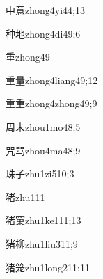 \begin{verbete}{中意}{zhong4yi4}{4;13}
\end{verbete}

\begin{verbete}{种地}{zhong4di4}{9;6}
\end{verbete}

\begin{verbete}{重}{zhong4}{9}
\end{verbete}

\begin{verbete}{重量}{zhong4liang4}{9;12}
\end{verbete}

\begin{verbete}{重重}{zhong4zhong4}{9;9}
\end{verbete}

\begin{verbete}{周末}{zhou1mo4}{8;5}
\end{verbete}

\begin{verbete}{咒骂}{zhou4ma4}{8;9}
\end{verbete}

\begin{verbete}{珠子}{zhu1zi5}{10;3}
\end{verbete}

\begin{verbete}{猪}{zhu1}{11}
\end{verbete}

\begin{verbete}{猪窠}{zhu1ke1}{11;13}
\end{verbete}

\begin{verbete}{猪柳}{zhu1liu3}{11;9}
\end{verbete}

\begin{verbete}{猪笼}{zhu1long2}{11;11}
\end{verbete}

